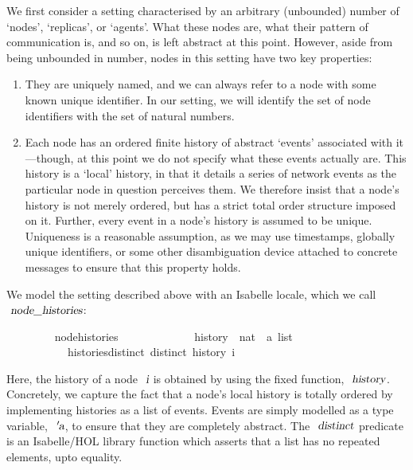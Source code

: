 \documentclass[acmlarge,review,anonymous]{acmart}\settopmatter{printfolios=true}
\begin{document}
We first consider a setting characterised by an arbitrary (unbounded) number of `nodes', `replicas', or `agents'.
What these nodes are, what their pattern of communication is, and so on, is left abstract at this point.
However, aside from being unbounded in number, nodes in this setting have two key properties:
\begin{enumerate}
\item
They are uniquely named, and we can always refer to a node with some known unique identifier.
In our setting, we will identify the set of node identifiers with the set of natural numbers.
\item
Each node has an ordered finite history of abstract `events' associated with it---though, at this point we do not specify what these events actually are.
This history is a `local' history, in that it details a series of network events as the particular node in question perceives them.
We therefore insist that a node's history is not merely ordered, but has a strict total order structure imposed on it.
Further, every event in a node's history is assumed to be unique.
Uniqueness is a reasonable assumption, as we may use timestamps, globally unique identifiers, or some other disambiguation device attached to concrete messages to ensure that this property holds.
\end{enumerate}

We model the setting described above with an Isabelle locale, which we call $\isa{node{\isacharunderscore}histories}$:
\\
\begin{isabellebody}
\ \ \ \ \ \ \ \  node{\isacharunderscore}histories\ {\isacharequal}\ \isanewline
\ \ \ \ \ \ \ \ \ \ \ history\ {\isacharcolon}{\isacharcolon}\ {\isachardoublequoteopen}nat\ {\isasymRightarrow}\ {\isacharprime}a\ list{\isachardoublequoteclose}\isanewline
\ \ \ \ \ \ \ \ \ \ \ histories{\isacharunderscore}distinct{\isacharcolon}\ {\isachardoublequoteopen}distinct\ {\isacharparenleft}history\ i{\isacharparenright}{\isachardoublequoteclose}
\end{isabellebody}
\vspace{\baselineskip}
Here, the history of a node $\isa{i}$ is obtained by using the fixed function, $\isa{history}$.
Concretely, we capture the fact that a node's local history is totally ordered by implementing histories as a list of events.
Events are simply modelled as a type variable, $\isa{{\isacharprime}a}$, to ensure that they are completely abstract.
The $\isa{distinct}$ predicate is an Isabelle/HOL library function which asserts that a list has no repeated elements, upto equality.
\end{document}
